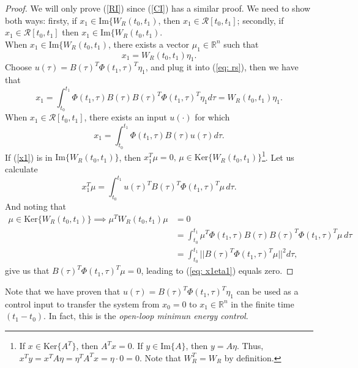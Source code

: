 \begin{proof}
	We will only prove (\ref{RI}) since (\ref{CI}) has a similar proof.
	We need to show both ways: firsty, if $x_1 \in \text{Im}\{W_R(t_0,t_1)$, then $x_1 \in \mathcal{R}[t_0,t_1]$; secondly, if $x_1 \in \mathcal{R}[t_0,t_1]$ then $x_1 \in \text{Im}\{W_R(t_0,t_1)$.\\
	When $x_1 \in \text{Im}\{W_R(t_0,t_1)$, there exists a vector $\mu_1\in\mathbb{R}^n$ such that
	\begin{equation}
	x_1 = W_R(t_0,t_1)\eta_1.
	\end{equation}
	Choose $u(\tau) = B(\tau)^T\Phi(t_1, \tau)^T\eta_1$, and plug it into (\ref{eq: rs}), then we have that
	\begin{equation}
	x_1 = \int_{t_0}^{t_1} \Phi(t_1,\tau)B(\tau) B(\tau)^T\Phi(t_1, \tau)^T \eta_1d\tau = W_R(t_0,t_1)\eta_1.
	\end{equation}
	When $x_1 \in \mathcal{R}[t_0,t_1]$, there exists an input $u(\cdot)$ for which
	\begin{equation}
		x_1 = \int_{t_0}^{t_1} \Phi(t_1,\tau)B(\tau)u(\tau)d\tau.
		\label{x1}
	\end{equation}
	If (\ref{x1}) is in $\text{Im}\{W_R(t_0,t_1)\}$, then $x_1^T\mu = 0, \, \mu \in \text{Ker}\{W_R(t_0,t_1)\}$\footnote{If $x\in\text{Ker}\{A^T\}$, then $A^Tx = 0$. If $y\in\text{Im}\{A\}$, then $y = A\eta$. Thus, $x^Ty = x^TA\eta = \eta^TA^Tx = \eta \cdot 0 = 0$. Note that $W_R^T = W_R$ by definition.}. Let us calculate
	\begin{equation}
		x_1^T\mu = \int_{t_0}^{t_1}u(\tau)^TB(\tau)^T\Phi(t_1,\tau)^T\mu \, d\tau. \label{eq: x1eta1}
	\end{equation}
	And noting that
	\begin{align}
	\mu \in \text{Ker}\{W_R(t_0,t_1)\} \implies \mu^TW_R(t_0,t_1)\mu &= 0 \nonumber \\ &= \int_{t_0}^{t_1}\mu^T \Phi(t_1,\tau)B(\tau)B(\tau)^T\Phi(t_1,\tau)^T \mu \, d\tau \nonumber \\ &= \int_{t_0}^{t_1} ||B(\tau)^T\Phi(t_1,\tau)^T \mu||^2 d \tau,
	\end{align}
	give us that $B(\tau)^T\Phi(t_1,\tau)^T \mu  = 0$, leading to (\ref{eq: x1eta1}) equals zero.
\end{proof}
\begin{remark}
Note that we have proven that $u(\tau) = B(\tau)^T\Phi(t_1,\tau)^T \eta_1$ can be used as a control input to transfer the system from $x_0 = 0$ to $x_1\in\mathbb{R}^n$ in the finite time $(t_1 - t_0)$. In fact, this is the \emph{open-loop minimun energy control}.
\end{remark}

